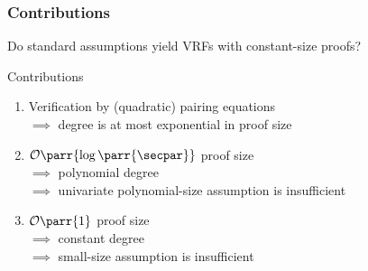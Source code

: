 \begin{frame}
    \frametitle{Contributions}
    \begin{mdframed}[backgroundcolor=black!10]
        Do standard assumptions yield VRFs with constant-size proofs?
    \end{mdframed}
    \pause
    \begin{block}{Contributions}
        \begin{enumerate}
            \item
            Verification by (quadratic) pairing equations
            \\\(\implies\) degree is at most exponential in proof size
            \pause
            \item
            \(\mathcal{O}\parr{\log\parr{\secpar}}\) proof size
            \\\(\implies\)
            polynomial degree
            \\\(\implies\)
            univariate polynomial-size assumption is insufficient
            \pause
            \item
            \(\mathcal{O}\parr{1}\) proof size
            \\\(\implies\)
            constant degree
            \\\(\implies\)
            small-size assumption is insufficient
        \end{enumerate}
    \end{block}
\end{frame}